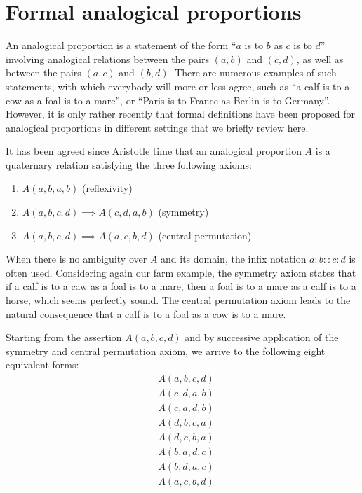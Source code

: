 \section{Formal analogical proportions}

An analogical proportion is a statement of the form ``$a$ is to $b$ as $c$ is
to $d$'' involving analogical relations between the pairs $(a,b)$ and $(c,d)$,
as well as between the pairs $(a,c)$ and $(b,d)$.  There are numerous examples
of such statements, with which everybody will more or less agree, such as  ``a
calf is to a cow as a foal is to a mare'', or ``Paris is to France as Berlin is
to Germany''. However, it is only rather recently that formal definitions have
been proposed for analogical proportions in different settings that we briefly
review here.

It has been agreed since Aristotle time that an analogical proportion $A$ is a
quaternary relation satisfying the three following axioms:

\begin{enumerate}
\item $A(a,b,a,b)$ (reflexivity)
\item $A(a,b,c,d) \implies A(c,d,a,b)$ (symmetry)
\item $A(a,b,c,d) \implies A(a,c,b,d)$ (central permutation)
\end{enumerate}

When there is no ambiguity over $A$ and its domain, the infix notation
$a:b::c:d$ is often used.  Considering again our farm example, the symmetry
axiom states that if a calf is to a caw as a foal is to a mare, then a foal is
to a mare as a calf is to a horse, which seems perfectly sound. The central
permutation axiom leads to the natural consequence that a calf is to a foal as
a cow is to a mare.

Starting from the assertion $A(a, b, c, d)$ and by successive application of
the symmetry and central permutation axiom, we arrive to the following eight
equivalent forms:
\begin{align*}
  &A(a, b, c, d)\\
  &A(c, d, a, b)\\
  &A(c, a, d, b)\\
  &A(d, b, c, a)\\
  &A(d, c, b, a)\\
  &A(b, a, d, c)\\
  &A(b, d, a, c)\\
  &A(a, c, b, d)
\end{align*}

